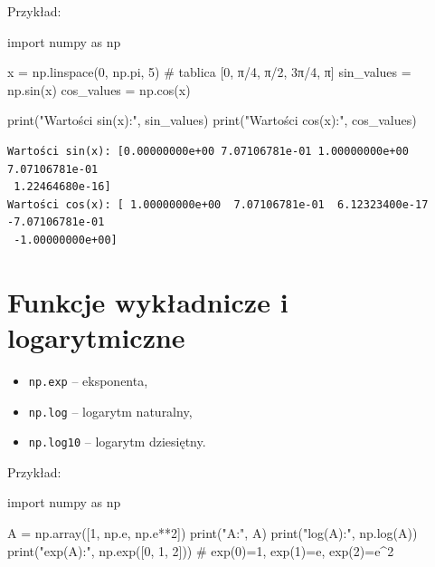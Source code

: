 \documentclass[
  letterpaper,
  DIV=11,
  numbers=noendperiod]{scrreprt}
\newenvironment{Shaded}{\begin{snugshade}}{\end{snugshade}}
\newcommand{\BuiltInTok}[1]{\textcolor[rgb]{0.00,0.23,0.31}{#1}}
\newcommand{\CommentTok}[1]{\textcolor[rgb]{0.37,0.37,0.37}{#1}}
\newcommand{\DecValTok}[1]{\textcolor[rgb]{0.68,0.00,0.00}{#1}}
\newcommand{\ImportTok}[1]{\textcolor[rgb]{0.00,0.46,0.62}{#1}}
\newcommand{\NormalTok}[1]{\textcolor[rgb]{0.00,0.23,0.31}{#1}}
\newcommand{\OperatorTok}[1]{\textcolor[rgb]{0.37,0.37,0.37}{#1}}
\newcommand{\StringTok}[1]{\textcolor[rgb]{0.13,0.47,0.30}{#1}}
\providecommand{\tightlist}{%
  \setlength{\itemsep}{0pt}\setlength{\parskip}{0pt}}\usepackage{longtable,booktabs,array}
\begin{document}
Przykład:

\begin{Shaded}
\begin{Highlighting}[]
\ImportTok{import}\NormalTok{ numpy }\ImportTok{as}\NormalTok{ np}

\NormalTok{x }\OperatorTok{=}\NormalTok{ np.linspace(}\DecValTok{0}\NormalTok{, np.pi, }\DecValTok{5}\NormalTok{) }\CommentTok{\# tablica [0, π/4, π/2, 3π/4, π]}
\NormalTok{sin\_values }\OperatorTok{=}\NormalTok{ np.sin(x)}
\NormalTok{cos\_values }\OperatorTok{=}\NormalTok{ np.cos(x)}

\BuiltInTok{print}\NormalTok{(}\StringTok{"Wartości sin(x):"}\NormalTok{, sin\_values)}
\BuiltInTok{print}\NormalTok{(}\StringTok{"Wartości cos(x):"}\NormalTok{, cos\_values)}
\end{Highlighting}
\end{Shaded}

\begin{verbatim}
Wartości sin(x): [0.00000000e+00 7.07106781e-01 1.00000000e+00 7.07106781e-01
 1.22464680e-16]
Wartości cos(x): [ 1.00000000e+00  7.07106781e-01  6.12323400e-17 -7.07106781e-01
 -1.00000000e+00]
\end{verbatim}

\section{Funkcje wykładnicze i
logarytmiczne}\label{funkcje-wykux142adnicze-i-logarytmiczne}

\begin{itemize}
\tightlist
\item
  \texttt{np.exp} -- eksponenta,
\item
  \texttt{np.log} -- logarytm naturalny,
\item
  \texttt{np.log10} -- logarytm dziesiętny.
\end{itemize}

Przykład:

\begin{Shaded}
\begin{Highlighting}[]
\ImportTok{import}\NormalTok{ numpy }\ImportTok{as}\NormalTok{ np}

\NormalTok{A }\OperatorTok{=}\NormalTok{ np.array([}\DecValTok{1}\NormalTok{, np.e, np.e}\OperatorTok{**}\DecValTok{2}\NormalTok{])}
\BuiltInTok{print}\NormalTok{(}\StringTok{"A:"}\NormalTok{, A)}
\BuiltInTok{print}\NormalTok{(}\StringTok{"log(A):"}\NormalTok{, np.log(A))}
\BuiltInTok{print}\NormalTok{(}\StringTok{"exp(A):"}\NormalTok{, np.exp([}\DecValTok{0}\NormalTok{, }\DecValTok{1}\NormalTok{, }\DecValTok{2}\NormalTok{]))  }\CommentTok{\# exp(0)=1, exp(1)=e, exp(2)=e\^{}2}
\end{Highlighting}
\end{Shaded}
\end{document}
